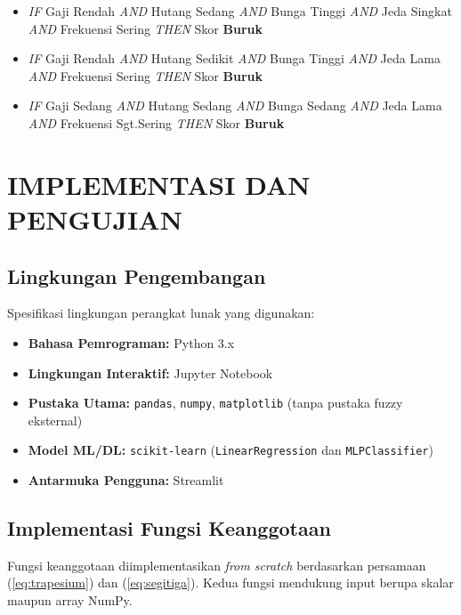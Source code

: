 \documentclass[12pt,a4paper]{report}
\begin{document}
\begin{itemize}
  \item[R30] \textit{IF} Gaji Rendah \textit{AND} Hutang Sedang \textit{AND} Bunga Tinggi \textit{AND} Jeda Singkat \textit{AND} Frekuensi Sering \textit{THEN} Skor \textbf{Buruk}
  \item[R31] \textit{IF} Gaji Rendah \textit{AND} Hutang Sedikit \textit{AND} Bunga Tinggi \textit{AND} Jeda Lama \textit{AND} Frekuensi Sering \textit{THEN} Skor \textbf{Buruk}
  \item[R32] \textit{IF} Gaji Sedang \textit{AND} Hutang Sedang \textit{AND} Bunga Sedang \textit{AND} Jeda Lama \textit{AND} Frekuensi Sgt.Sering \textit{THEN} Skor \textbf{Buruk}
\end{itemize}

\chapter{IMPLEMENTASI DAN PENGUJIAN}

\section{Lingkungan Pengembangan}

Spesifikasi lingkungan perangkat lunak yang digunakan:
\begin{itemize}
  \item \textbf{Bahasa Pemrograman:} Python 3.x
  \item \textbf{Lingkungan Interaktif:} Jupyter Notebook
  \item \textbf{Pustaka Utama:} \texttt{pandas}, \texttt{numpy},
        \texttt{matplotlib} (tanpa pustaka fuzzy eksternal)
  \item \textbf{Model ML/DL:} \texttt{scikit-learn}
        (\texttt{LinearRegression} dan \texttt{MLPClassifier})
  \item \textbf{Antarmuka Pengguna:} Streamlit
\end{itemize}

\section{Implementasi Fungsi Keanggotaan}

Fungsi keanggotaan diimplementasikan \textit{from scratch}
berdasarkan persamaan (\ref{eq:trapesium}) dan
(\ref{eq:segitiga}). Kedua fungsi mendukung input berupa
skalar maupun array NumPy.
\end{document}
